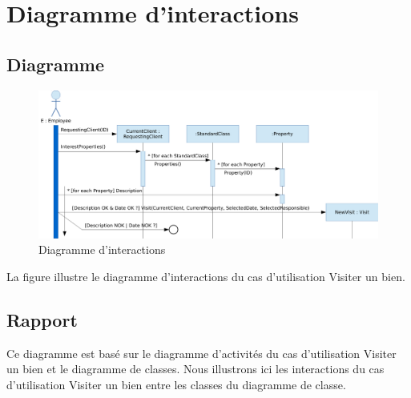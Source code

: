 \chapter{Diagramme d'interactions}

\section{Diagramme}

\begin{figure}
  \centering
  \includegraphics[scale=0.67,angle=90]{IMG/id}
  \caption{Diagramme d'interactions}
  \label{img_id}
\end{figure}

La figure  illustre le diagramme d'interactions du cas d'utilisation \og{}Visiter un bien\fg{}.

\section{Rapport}

Ce diagramme est basé sur le diagramme d'activités du cas d'utilisation \og{}Visiter un bien\fg{} et le diagramme de classes. Nous illustrons ici les interactions du cas d'utilisation \og{}Visiter un bien\fg{} entre les classes du diagramme de classe.